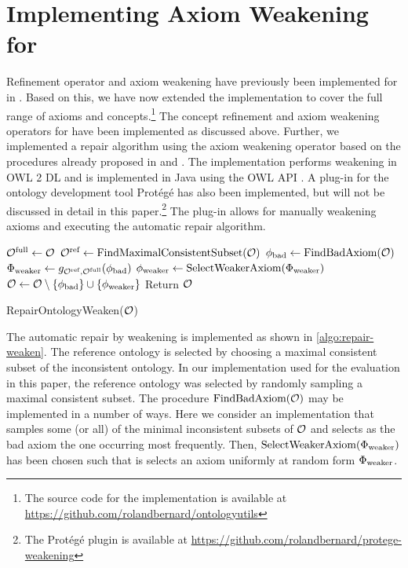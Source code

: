 \documentclass[
]{ceurart}
\begin{document}
\section{Implementing Axiom Weakening for \SROIQ}

Refinement operator and axiom weakening have previously been implemented for \ALC in \cite{troquard2018repairing}. Based on this, we have now extended the implementation to cover the full range of \SROIQ axioms and concepts.\footnote{The source code for the implementation is available at \url{https://github.com/rolandbernard/ontologyutils}} The concept refinement and axiom weakening operators for \SROIQ have been implemented as discussed above. Further, we implemented a repair algorithm using the axiom weakening operator based on the procedures already proposed in \cite{troquard2018repairing} and \cite{confalonieri2020towards}. The implementation performs weakening in OWL 2 DL \cite{motik2009owl} and is implemented in Java using the OWL API \cite{horridge2011owl}. A plug-in for the ontology development tool Protégé has also been implemented, but will not be discussed in detail in this paper.\footnote{The Protégé plugin is available at \url{https://github.com/rolandbernard/protege-weakening}} The plug-in allows for manually weakening axioms and executing the automatic repair algorithm.

\begin{algorithm}[t]
  \begin{algorithmic}
    \State ${\mathcal{O}^\textnormal{full}} \gets \mathcal{O}$
    \State ${\mathcal{O}^\textnormal{ref}} \gets \textnormal{FindMaximalConsistentSubset(\ensuremath{\mathcal{O}})}$
      \State $\phi_\textnormal{bad} \gets \textnormal{FindBadAxiom}(\mathcal{O})$
      \State $\Phi_\textnormal{weaker} \gets g_{{\mathcal{O}^\textnormal{ref}},{\mathcal{O}^\textnormal{full}}}(\phi_\textnormal{bad})$
      \State $\phi_\textnormal{weaker} \gets \textnormal{SelectWeakerAxiom}(\Phi_\textnormal{weaker})$
      \State $\mathcal{O} \gets \mathcal{O} \setminus \{\phi_\textnormal{bad}\} \cup \{\phi_\textnormal{weaker}\}$
    \EndWhile
    \State Return $\mathcal{O}$
  \end{algorithmic}
  \caption{RepairOntologyWeaken($\mathcal{O}$)}
	\label{algo:repair-weaken}
\end{algorithm}

The automatic repair by weakening is implemented as shown in \cref{algo:repair-weaken}. The reference ontology is selected by choosing a maximal consistent subset of the inconsistent ontology. In our implementation used for the evaluation in this paper, the reference ontology was selected by randomly sampling a maximal consistent subset. The procedure $\textnormal{FindBadAxiom}(\mathcal{O})$ may be implemented in a number of ways. Here we consider an implementation that samples some (or all) of the minimal inconsistent subsets of $\mathcal{O}$ and selects as the bad axiom the one occurring most frequently. Then, $\textnormal{SelectWeakerAxiom}(\Phi_\textnormal{weaker})$ has been chosen such that is selects an axiom uniformly at random form $\Phi_\textnormal{weaker}$.
\end{document}
